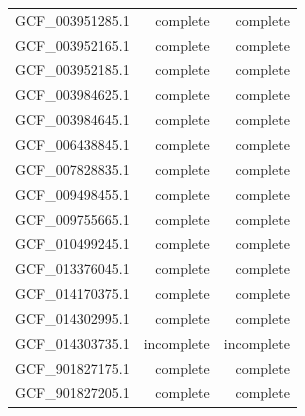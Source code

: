 \documentclass[sn-mathphys,Numbered]{sn-jnl}  %
\theoremstyle{thmstyleone}%
\theoremstyle{thmstyletwo}%
\theoremstyle{thmstylethree}%
\begin{document}
\begin{appendices}
\begin{table}[h!]
\begin{tabular}{rrr}
                GCF\_003951285.1 & complete               & complete                   \\
                GCF\_003952165.1 & complete               & complete                   \\
                GCF\_003952185.1 & complete               & complete                   \\
                GCF\_003984625.1 & complete               & complete                   \\
                GCF\_003984645.1 & complete               & complete                   \\
                GCF\_006438845.1 & complete               & complete                   \\
                GCF\_007828835.1 & complete               & complete                   \\
                GCF\_009498455.1 & complete               & complete                   \\
                GCF\_009755665.1 & complete               & complete                   \\
                GCF\_010499245.1 & complete               & complete                   \\
                GCF\_013376045.1 & complete               & complete                   \\
                GCF\_014170375.1 & complete               & complete                   \\
                GCF\_014302995.1 & complete               & complete                   \\
                GCF\_014303735.1 & incomplete             & incomplete                 \\
                GCF\_901827175.1 & complete               & complete                   \\ 
                GCF\_901827205.1 & complete               & complete              
            \end{tabular}
        \end{table}


\end{appendices}
\end{document}

